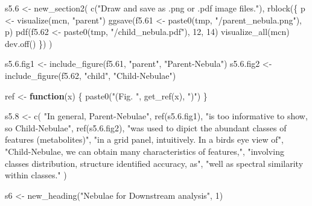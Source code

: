\documentclass[
]{article}
\newenvironment{Shaded}{\begin{snugshade}}{\end{snugshade}}
\newcommand{\ControlFlowTok}[1]{\textcolor[rgb]{0.13,0.29,0.53}{\textbf{#1}}}
\newcommand{\DecValTok}[1]{\textcolor[rgb]{0.00,0.00,0.81}{#1}}
\newcommand{\FloatTok}[1]{\textcolor[rgb]{0.00,0.00,0.81}{#1}}
\newcommand{\FunctionTok}[1]{\textcolor[rgb]{0.00,0.00,0.00}{#1}}
\newcommand{\NormalTok}[1]{#1}
\newcommand{\OtherTok}[1]{\textcolor[rgb]{0.56,0.35,0.01}{#1}}
\newcommand{\StringTok}[1]{\textcolor[rgb]{0.31,0.60,0.02}{#1}}
\begin{document}
\begin{Shaded}
\begin{Highlighting}[]
\NormalTok{s5}\FloatTok{.6} \OtherTok{\textless{}{-}} \FunctionTok{new\_section2}\NormalTok{(}
  \FunctionTok{c}\NormalTok{(}\StringTok{"Draw and save as .png or .pdf image files."}\NormalTok{),}
  \FunctionTok{rblock}\NormalTok{(\{}
\NormalTok{    p }\OtherTok{\textless{}{-}} \FunctionTok{visualize}\NormalTok{(mcn, }\StringTok{"parent"}\NormalTok{)}
    \FunctionTok{ggsave}\NormalTok{(f5}\FloatTok{.61} \OtherTok{\textless{}{-}} \FunctionTok{paste0}\NormalTok{(tmp, }\StringTok{"/parent\_nebula.png"}\NormalTok{), p)}
    \FunctionTok{pdf}\NormalTok{(f5}\FloatTok{.62} \OtherTok{\textless{}{-}} \FunctionTok{paste0}\NormalTok{(tmp, }\StringTok{"/child\_nebula.pdf"}\NormalTok{), }\DecValTok{12}\NormalTok{, }\DecValTok{14}\NormalTok{)}
    \FunctionTok{visualize\_all}\NormalTok{(mcn)}
    \FunctionTok{dev.off}\NormalTok{()}
\NormalTok{  \})}
\NormalTok{)}

\NormalTok{s5.}\FloatTok{6.}\NormalTok{fig1 }\OtherTok{\textless{}{-}} \FunctionTok{include\_figure}\NormalTok{(f5}\FloatTok{.61}\NormalTok{, }\StringTok{"parent"}\NormalTok{, }\StringTok{"Parent{-}Nebula"}\NormalTok{)}
\NormalTok{s5.}\FloatTok{6.}\NormalTok{fig2 }\OtherTok{\textless{}{-}} \FunctionTok{include\_figure}\NormalTok{(f5}\FloatTok{.62}\NormalTok{, }\StringTok{"child"}\NormalTok{, }\StringTok{"Child{-}Nebulae"}\NormalTok{)}

\NormalTok{ref }\OtherTok{\textless{}{-}} \ControlFlowTok{function}\NormalTok{(x) \{}
  \FunctionTok{paste0}\NormalTok{(}\StringTok{"(Fig. "}\NormalTok{, }\FunctionTok{get\_ref}\NormalTok{(x), }\StringTok{")"}\NormalTok{)}
\NormalTok{\}}

\NormalTok{s5}\FloatTok{.8} \OtherTok{\textless{}{-}} \FunctionTok{c}\NormalTok{(}
  \StringTok{"In general, Parent{-}Nebulae"}\NormalTok{, }\FunctionTok{ref}\NormalTok{(s5.}\FloatTok{6.}\NormalTok{fig1),}
  \StringTok{"is too informative to show, so Child{-}Nebulae"}\NormalTok{, }\FunctionTok{ref}\NormalTok{(s5.}\FloatTok{6.}\NormalTok{fig2),}
  \StringTok{"was used to dipict the abundant classes of features (metabolites)"}\NormalTok{,}
  \StringTok{"in a grid panel, intuitively. In a bird\textquotesingle{}s eye view of"}\NormalTok{,}
  \StringTok{"Child{-}Nebulae, we can obtain many characteristics of features,"}\NormalTok{,}
  \StringTok{"involving classes distribution, structure identified accuracy, as"}\NormalTok{,}
  \StringTok{"well as spectral similarity within classes."}
\NormalTok{)}

\NormalTok{s6 }\OtherTok{\textless{}{-}} \FunctionTok{new\_heading}\NormalTok{(}\StringTok{"Nebulae for Downstream analysis"}\NormalTok{, }\DecValTok{1}\NormalTok{)}


\end{Highlighting}
\end{Shaded}
\end{document}
